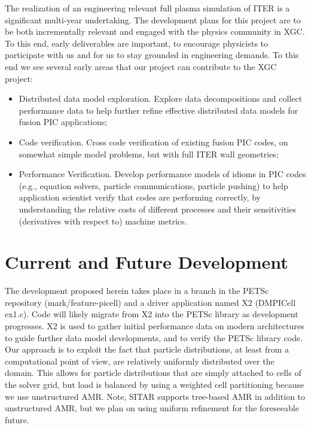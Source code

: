 \documentclass[review]{siamart}
\begin{document}
The realization of an engineering relevant full plasma simulation of ITER is a significant multi-year undertaking.
The development plans for this project are to be both incrementally relevant and engaged with the physics community in XGC.
To this end, early deliverables are important, to encourage physicists to participate with us and for us to stay grounded in engineering demands.
To this end we see several early areas that our project can contribute to the XGC project:
\begin{itemize}
\item Distributed data model exploration. Explore data decompositions and collect performance data to help further refine effective distributed data models for fusion PIC applications;
\item Code verification. Cross code verification of existing fusion PIC codes, on somewhat simple model problems, but with full ITER wall geometries;
\item Performance Verification.  Develop performance models of idioms in PIC codes (e.g., equation solvers, particle communications, particle pushing) to help application scientist verify that codes are performing correctly, by understanding the relative costs of different processes and their sensitivities (derivatives with respect to) machine metrics.
\end{itemize}
 

\section{Current and Future Development}
\label{sec:x2}

The development proposed herein takes place in a branch in the PETSc repository (mark/feature-picell) and a driver application named X2 (DMPICell ex1.c).
Code will likely migrate from X2 into the PETSc library as development progresses.
X2 is used to gather initial performance data on modern architectures to guide further data model developments, and to verify the PETSc library code.
Our approach is to exploit the fact that particle distributions, at least from a computational point of view, are relatively uniformly distributed over the domain.
This allows for particle distributions that are simply attached to cells of the solver grid, but load is balanced by using a weighted cell partitioning because we use unstructured AMR.
Note, SITAR supports tree-based AMR in addition to unstructured AMR, but we plan on using uniform refinement for the foreseeable future.
\end{document}
